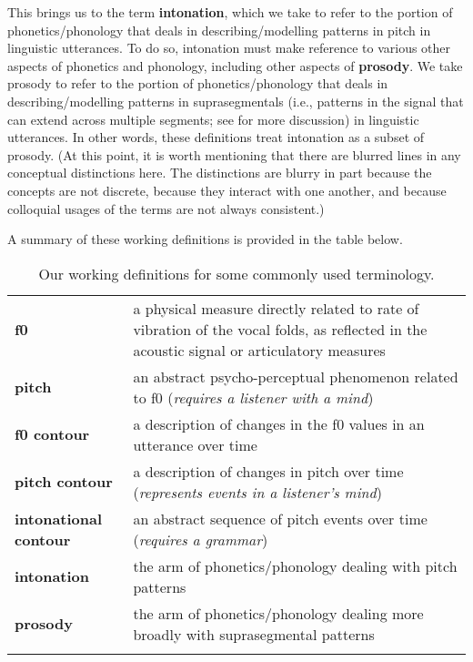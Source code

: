 This brings us to the term \textbf{intonation}, which we take to refer to the portion of phonetics\slash phonology that deals in describing\slash modelling patterns in pitch in linguistic utterances. To do so, intonation must make reference to various other aspects of phonetics and phonology, including other aspects of \textbf{prosody}. We take prosody to refer to the portion of phonetics\slash phonology that deals in describing\slash modelling patterns in suprasegmentals (i.e., patterns in the signal that can extend across multiple segments; see \citealt{lehiste70} for more discussion) in linguistic utterances. In other words, these definitions treat intonation as a subset of prosody. (At this point, it is worth mentioning that there are blurred lines in any conceptual distinctions here. The distinctions are blurry in part because the concepts are not discrete, because they interact with one another, and because colloquial usages of the terms are not always consistent.)

A summary of these working definitions is provided in the table below.

\begin{longtable}{>{\bfseries}p{.175\linewidth}p{.75\linewidth}} \endhead\toprule 
f0 &
a physical measure directly related to rate of vibration of the vocal folds, as reflected in the acoustic signal or articulatory measures
\tabularnewline\hdashline
pitch &
an abstract psycho-perceptual phenomenon related to f0 (\textit{requires a listener with a mind})
\tabularnewline\hdashline
f0 contour &
a description of changes in the f0 values in an utterance over time
\tabularnewline\hdashline
pitch contour &
a description of changes in pitch over time (\textit{represents events in a listener’s mind})
\tabularnewline\hdashline
intonational contour &
an abstract sequence of pitch events over time (\textit{requires a grammar})
\tabularnewline\hdashline
intonation &
the arm of phonetics\slash phonology dealing with pitch patterns
\tabularnewline\hdashline
prosody &
the arm of phonetics\slash phonology dealing more broadly with suprasegmental patterns
\tabularnewline\bottomrule 
\caption{Our working definitions for some commonly used terminology.
\label{tab:terminology}
}
\end{longtable}


\DIFdelbegin \section{}%
\addtocounter{section}{-1}%

